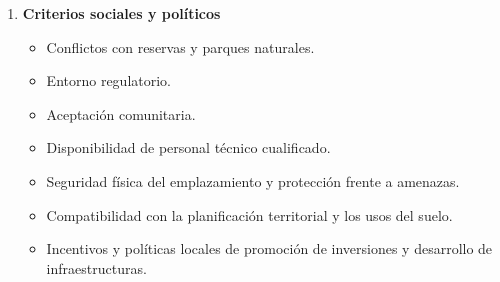 \begin{enumerate}[label=\arabic*. ,leftmargin=*,itemsep=1em]
    \item \textbf{Criterios sociales y políticos}
    \begin{itemize}[leftmargin=*,nosep]
        \item Conflictos con reservas y parques naturales.
        \item Entorno regulatorio.
        \item Aceptación comunitaria.
        \item Disponibilidad de personal técnico cualificado. %
        \item Seguridad física del emplazamiento y protección frente a amenazas. %
        \item Compatibilidad con la planificación territorial y los usos del suelo. %
        \item Incentivos y políticas locales de promoción de inversiones y desarrollo de infraestructuras. %
    \end{itemize}
\end{enumerate}